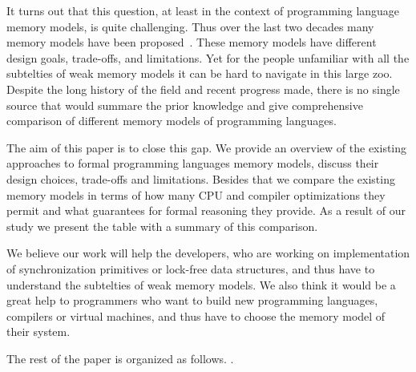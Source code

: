 \documentclass[a4paper,twoside,11pt]{article}
\numberwithin{equation}{section}
\begin{document}
It turns out that this question, 
at least in the context of programming language 
memory models, is quite challenging. 
Thus over the last two decades many memory models have been proposed~\cite{
Manson-al:POPL05, Batty-al:POPL11, Batty-el:POPL16, 
Dolan-al:PLDI18, Watt-el:OOPSLA19, Watt-el:PLDI2020, 
Jeffrey-Riely:LICS16, PichonPharabod-Sewell:POPL16, 
Podkopaev-al:CoRR16, Kang-al:POPL17, Chakraborty-Vafeiadis:POPL19, 
Paviotti-el:ESOP20, Lee-el:PLDI20}. 
These memory models have different design goals, trade-offs, and limitations.
Yet for the people unfamiliar with all the subtelties 
of weak memory models it can be hard to navigate in this large zoo.
Despite the long history of the field and recent progress made, 
there is no single source that would summare the prior knowledge
and give comprehensive comparison of different memory models
of programming languages.

The aim of this paper is to close this gap.
We provide an overview of the existing approaches to 
formal programming languages memory models,
discuss their design choices, trade-offs and limitations.
Besides that we compare the existing memory models 
in terms of how many CPU and compiler optimizations 
they permit and what guarantees for formal reasoning they provide.
As a result of our study we present the table with a summary of this comparison.

We believe our work will help the developers,
who are working on implementation of synchronization primitives
or lock-free data structures, and thus have to understand 
the subtelties of weak memory models.
We also think it would be a great help to 
programmers who want to build new 
programming languages, compilers or virtual machines,
and thus have to choose the memory model of their system. 

The rest of the paper is organized as follows.
\todo{}.
\end{document}
